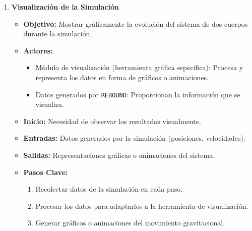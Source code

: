 \begin{enumerate}
    \item \textbf{Visualización de la Simulación}
        \begin{itemize}
            \item \textbf{Objetivo:} Mostrar gráficamente la evolución del sistema de dos cuerpos durante la simulación.
            \item \textbf{Actores:}
                \begin{itemize}
                    \item Módulo de visualización (herramienta gráfica específica): Procesa y representa los datos en forma de gráficos o animaciones.
                    \item Datos generados por \texttt{REBOUND}: Proporcionan la información que se visualiza.
                \end{itemize}
            \item \textbf{Inicio:} Necesidad de observar los resultados visualmente.
            \item \textbf{Entradas:} Datos generados por la simulación (posiciones, velocidades).
            \item \textbf{Salidas:} Representaciones gráficas o animaciones del sistema.
            \item \textbf{Pasos Clave:}
                \begin{enumerate}
                    \item Recolectar datos de la simulación en cada paso.
                    \item Procesar los datos para adaptarlos a la herramienta de visualización.
                    \item Generar gráficos o animaciones del movimiento gravitacional.
                \end{enumerate}
        \end{itemize}


\end{enumerate}
